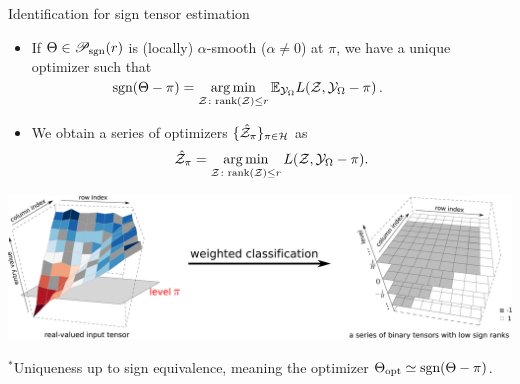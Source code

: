 \documentclass[10pt, mathserif]{beamer} %
\theoremstyle{definition}
\theoremstyle{plain}
\def\sign{\textup{sgn}}
\def\caliP{\mathscr{P}_{\textup{sgn}}}
\def\caliP{\mathscr{P}_{\textup{sgn}}}
\begin{document}
\begin{frame}{Identification for sign tensor estimation}
   \begin{itemize}
    \item If $\Theta\in\caliP(r)$ is (locally) {\color{red}$\alpha$-smooth ($\alpha\neq 0$)} at $\pi$, we have {\color{red}a unique optimizer} such that\\[.1cm]
       $\hspace{2cm}\text{sgn}(\Theta-\pi) = \operatorname*{arg\,min}\limits_{\mathcal{Z}\colon \text{rank}(\mathcal{Z})\leq r} \mathbb{E}_{\mathcal{Y}_\Omega}L(\mathcal{Z},\mathcal{Y}_\Omega-\pi)$.\vspace*{.1cm}

    \item We obtain a series of optimizers $\{\hat {\mathcal{Z}}_\pi\}_{\pi\in\mathcal{H}}$ as
    \begin{align}
        \hat {\mathcal{Z}}_\pi = \operatorname*{arg\,min}_{\mathcal{Z}\colon \text{rank}(\mathcal{Z})\leq r}L(\mathcal{Z},\mathcal{Y}_\Omega-\pi).
    \end{align}
    \end{itemize}
 \vspace{-.2cm} 
 
     \begin{center}
 \includegraphics[width = \textwidth]{Figures/weightedclassification.pdf}
 \end{center}
 
     
     \vspace{-.4cm}
 {\hfill \tiny  $^*$Uniqueness up to sign equivalence, meaning the optimizer $\Theta_{\text{opt}} \simeq \sign(\Theta-\pi)$.}
\end{frame}
\end{document}

